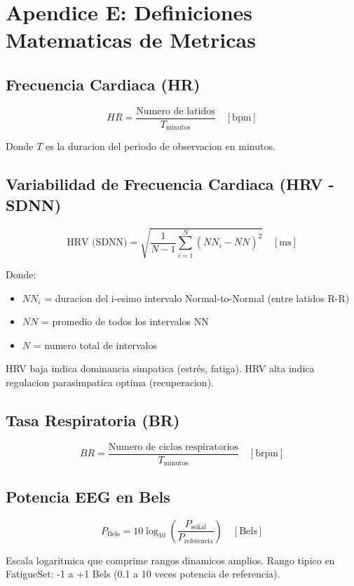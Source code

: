 \section*{Apendice E: Definiciones Matematicas de Metricas}

\subsection*{Frecuencia Cardiaca (HR)}

$$HR = \frac{\text{Numero de latidos}}{T_{\text{minutos}}} \quad [\text{bpm}]$$

Donde $T$ es la duracion del periodo de observacion en minutos.

\subsection*{Variabilidad de Frecuencia Cardiaca (HRV - SDNN)}

$$\text{HRV (SDNN)} = \sqrt{\frac{1}{N-1} \sum_{i=1}^{N} (NN_i - \overline{NN})^2} \quad [\text{ms}]$$

Donde:
\begin{itemize}
    \item $NN_i$ = duracion del i-esimo intervalo Normal-to-Normal (entre latidos R-R)
    \item $\overline{NN}$ = promedio de todos los intervalos NN
    \item $N$ = numero total de intervalos
\end{itemize}

HRV baja indica dominancia simpatica (estrés, fatiga).
HRV alta indica regulacion parasimpatica optima (recuperacion).

\subsection*{Tasa Respiratoria (BR)}

$$BR = \frac{\text{Numero de ciclos respiratorios}}{T_{\text{minutos}}} \quad [\text{brpm}]$$

\subsection*{Potencia EEG en Bels}

$$P_{\text{Bels}} = 10 \log_{10}\left(\frac{P_{\text{señal}}}{P_{\text{referencia}}}\right) \quad [\text{Bels}]$$

Escala logaritmica que comprime rangos dinamicos amplios.
Rango tipico en FatigueSet: -1 a +1 Bels (0.1 a 10 veces potencia de referencia).

